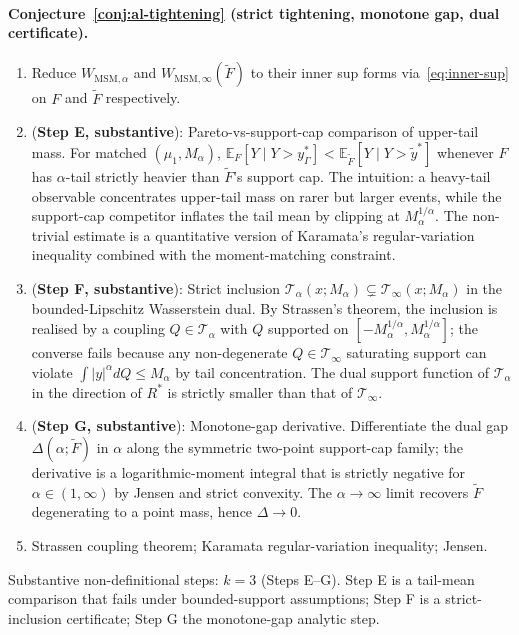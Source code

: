 \documentclass[11pt]{article}
\newcommand{\E}{\mathbb{E}}
\theoremstyle{definition}
\theoremstyle{plain}
\theoremstyle{remark}
\begin{document}
\paragraph{Conjecture~\ref{conj:al-tightening} (strict tightening, monotone gap, dual certificate).}
\begin{enumerate}[label=(\arabic*)]
  \item[$\leftarrow$] [\emph{unfold \S6}] Reduce $W_{\mathrm{MSM},\alpha}$ and $W_{\mathrm{MSM},\infty}(\tilde F)$ to their inner sup forms via~\eqref{eq:inner-sup} on $F$ and $\tilde F$ respectively.
  \item[$\leftarrow$] (\textbf{Step E, substantive}): Pareto-vs-support-cap comparison of upper-tail mass. For matched $(\mu_1, M_\alpha)$, $\E_F[Y \mid Y > y_\Gamma^*] < \E_{\tilde F}[Y \mid Y > \tilde y^*]$ whenever $F$ has $\alpha$-tail strictly heavier than $\tilde F$'s support cap. The intuition: a heavy-tail observable concentrates upper-tail mass on rarer but larger events, while the support-cap competitor inflates the tail mean by clipping at $M_\alpha^{1/\alpha}$. The non-trivial estimate is a quantitative version of Karamata's regular-variation inequality combined with the moment-matching constraint.
  \item[$\leftarrow$] (\textbf{Step F, substantive}): Strict inclusion $\mathcal{T}_\alpha(x; M_\alpha) \subsetneq \mathcal{T}_\infty(x; M_\alpha)$ in the bounded-Lipschitz Wasserstein dual. By Strassen's theorem, the inclusion is realised by a coupling $Q \in \mathcal{T}_\alpha$ with $Q$ supported on $[-M_\alpha^{1/\alpha}, M_\alpha^{1/\alpha}]$; the converse fails because any non-degenerate $Q \in \mathcal{T}_\infty$ saturating support can violate $\int |y|^\alpha dQ \le M_\alpha$ by tail concentration. The dual support function of $\mathcal{T}_\alpha$ in the direction of $R^*$ is strictly smaller than that of $\mathcal{T}_\infty$.
  \item[$\leftarrow$] (\textbf{Step G, substantive}): Monotone-gap derivative. Differentiate the dual gap $\Delta(\alpha; \tilde F)$ in $\alpha$ along the symmetric two-point support-cap family; the derivative is a logarithmic-moment integral that is strictly negative for $\alpha \in (1, \infty)$ by Jensen and strict convexity. The $\alpha \to \infty$ limit recovers $\tilde F$ degenerating to a point mass, hence $\Delta \to 0$.
  \item[$\leftarrow$] [\emph{classical}] Strassen coupling theorem; Karamata regular-variation inequality; Jensen.
\end{enumerate}
Substantive non-definitional steps: $k = 3$ (Steps E--G). Step E is a tail-mean comparison that fails under bounded-support assumptions; Step F is a strict-inclusion certificate; Step G the monotone-gap analytic step.
\end{document}
